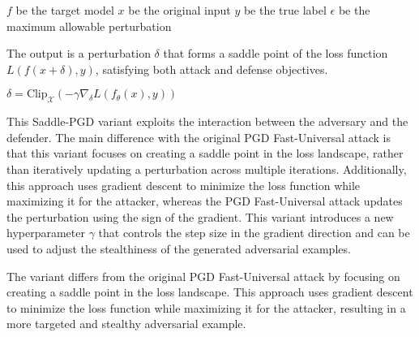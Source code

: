 \( f \) be the target model
\( x \) be the original input 
\( y \) be the true label
\( \epsilon \) be the maximum allowable perturbation

The output is a perturbation \( \delta \) that forms a saddle point of the loss function \( L(f(x + \delta), y) \), satisfying both attack and defense objectives.

$\delta = \text{Clip}_{\mathcal{X}} \left( -\gamma \nabla_\delta L(f_\theta(x), y) \right)$

This Saddle-PGD variant exploits the interaction between the adversary and the defender. The main difference with the original PGD Fast-Universal attack is that this variant focuses on creating a saddle point in the loss landscape, rather than iteratively updating a perturbation across multiple iterations. Additionally, this approach uses gradient descent to minimize the loss function while maximizing it for the attacker, whereas the PGD Fast-Universal attack updates the perturbation using the sign of the gradient. This variant introduces a new hyperparameter \( \gamma \) that controls the step size in the gradient direction and can be used to adjust the stealthiness of the generated adversarial examples.

The variant differs from the original PGD Fast-Universal attack by focusing on creating a saddle point in the loss landscape. This approach uses gradient descent to minimize the loss function while maximizing it for the attacker, resulting in a more targeted and stealthy adversarial example.